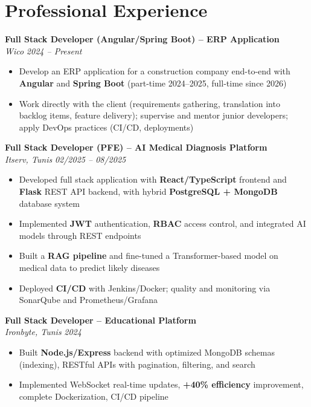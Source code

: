 \documentclass[10pt,a4paper]{article}
\begin{document}
\vspace{6pt}

\section*{Professional Experience}
{\small

\textbf{Full Stack Developer (Angular/Spring Boot) -- ERP Application}\\[1pt]
\textit{Wico} \hfill \textit{2024 -- Present}
\begin{itemize}
  \item Develop an ERP application for a construction company end-to-end with \textbf{Angular} and \textbf{Spring Boot} (part-time 2024--2025, full-time since 2026)
  \item Work directly with the client (requirements gathering, translation into backlog items, feature delivery); supervise and mentor junior developers; apply DevOps practices (CI/CD, deployments)
\end{itemize}

\vspace{3pt}
\textbf{Full Stack Developer (PFE) -- AI Medical Diagnosis Platform}\\[1pt]
\textit{Itserv, Tunis} \hfill \textit{02/2025 -- 08/2025}
\begin{itemize}
  \item Developed full stack application with \textbf{React/TypeScript} frontend and \textbf{Flask} REST API backend, with hybrid \textbf{PostgreSQL + MongoDB} database system
  \item Implemented \textbf{JWT} authentication, \textbf{RBAC} access control, and integrated AI models through REST endpoints
  \item Built a \textbf{RAG pipeline} and fine-tuned a Transformer-based model on medical data to predict likely diseases
  \item Deployed \textbf{CI/CD} with Jenkins/Docker; quality and monitoring via SonarQube and Prometheus/Grafana
\end{itemize}

\vspace{3pt}
\textbf{Full Stack Developer -- Educational Platform}\\[1pt]
\textit{Ironbyte, Tunis} \hfill \textit{2024}
\begin{itemize}
  \item Built \textbf{Node.js/Express} backend with optimized MongoDB schemas (indexing), RESTful APIs with pagination, filtering, and search
  \item Implemented WebSocket real-time updates, \textbf{+40\% efficiency} improvement, complete Dockerization, CI/CD pipeline
\end{itemize}

}
\end{document}
